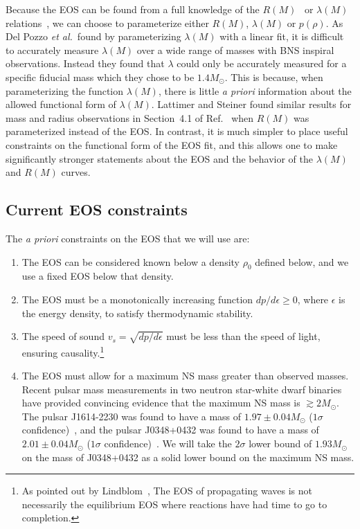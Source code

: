 \documentclass[twocolumn,prd,amssymb,aps,nofootinbib,showpacs,epsf]{revtex4}
\begin{document}
Because the EOS can be found from a full knowledge of the $R(M)$~\cite{Lindblom1992} or $\lambda(M)$ relations~\cite{LindblomIndik2012, LindblomIndik2014}, we can choose to parameterize either $R(M)$, $\lambda(M)$ or $p(\rho)$. As Del Pozzo {\it et al.}\ found by parameterizing $\lambda(M)$ with a linear fit, it is difficult to accurately measure $\lambda(M)$ over a wide range of masses with BNS inspiral observations. Instead they found that $\lambda$ could only be accurately measured for a specific fiducial mass which they chose to be $1.4M_\odot$. This is because, when parameterizing the function $\lambda(M)$, there is little {\it a priori} information about the allowed functional form of $\lambda(M)$. Lattimer and Steiner found similar results for mass and radius observations in Section~4.1 of Ref.~\cite{LattimerSteiner2014} when $R(M)$ was parameterized instead of the EOS. In contrast, it is much simpler to place useful constraints on the functional form of the EOS fit, and this allows one to make significantly stronger statements about the EOS and the behavior of the $\lambda(M)$ and $R(M)$ curves.

\subsection{Current EOS constraints}
\label{sec:eosconstraints}

The {\it a priori} constraints on the EOS that we will use are:
\begin{enumerate}
\item The EOS can be considered known below a density $\rho_0$ defined below, and we use a fixed EOS below that density.
\item The EOS must be a monotonically increasing function $dp/d\epsilon \ge 0$, where $\epsilon$ is the energy density, to satisfy thermodynamic stability.
\item The speed of sound $v_s = \sqrt{dp/d\epsilon}$ must be less than the speed of light, ensuring causality.\footnote{As pointed out by Lindblom~\cite{Lindblom2010}, The EOS of propagating waves is not necessarily the equilibrium EOS where reactions have had time to go to completion.} 
\item The EOS must allow for a maximum NS mass greater than observed masses. Recent pulsar mass measurements in two neutron star-white dwarf binaries have provided convincing evidence that the maximum NS mass is $\gtrsim 2M_\odot$. The pulsar J1614-2230 was found to have a mass of $1.97\pm0.04M_\odot$ ($1\sigma$ confidence)~\cite{DemorestPennucciRansom2010}, and the pulsar J0348+0432 was found to have a mass of $2.01\pm0.04M_\odot$ ($1\sigma$ confidence)~\cite{AntoniadisFreireWex2013}. We will take the $2\sigma$ lower bound of $1.93M_\odot$ on the mass of J0348+0432 as a solid lower bound on the maximum NS mass.
\end{enumerate}
\end{document}
